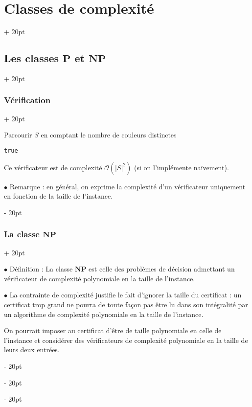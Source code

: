 \documentclass[a4paper, 12pt, twoside]{article}
\newenvironment{indalgo}[2][H]{
    \begin{algoBox}
        \begin{algorithm}[#1]
            \caption{#2}
}
{
        \end{algorithm}
    \end{algoBox}
}
\newcommand{\lr}[1]{\left( #1 \right)}
\newcommand{\set}[1]{\left\{ #1 \right\}}
\newcommand{\abs}[1]{\left\lvert #1 \right\rvert}
\newcommand{\ind}[1][20pt]{\advance\leftskip + #1}
\newcommand{\deind}[1][20pt]{\advance\leftskip - #1}
\newenvironment{indt}[2][20pt]{#2 \par \ind[#1]}{\par \deind} %
\begin{document}
\begin{indt}{\section{Classes de complexité}}
\begin{indt}{\subsection{Les classes $\mathbf P$ et $\mathbf{NP}$}}
\begin{indt}{\subsubsection{Vérification}}
\begin{indalgo}{Vérificateur du problème de coloration}
                    \BlankLine

                    Parcourir $S$ en comptant le nombre de couleurs distinctes\;


                    \For{tout $\set{s, s'} \in A$}{
                        \If{$c(s) = c(s')$}{
                            \Return \texttt{false}\;
                        }
                    }

                    \Return \texttt{true}\;
                \end{indalgo}

                Ce vérificateur est de complexité $\mathcal O\!\lr{\abs S ^2}$ (si on l'implémente naïvement).

                \vspace{12pt}
                
                $\bullet$ Remarque : en général, on exprime la complexité d'un vérificateur uniquement  en fonction de la taille de l'instance.
            \end{indt}

            \vspace{12pt}
            
            \begin{indt}{\subsubsection{La classe $\mathbf{NP}$}}
                \label{2.2.3}

                $\bullet$ Définition : La classe $\mathbf{NP}$ est celle des problèmes de décision admettant un vérificateur de complexité polynomiale en la taille de l'instance.

                \vspace{12pt}
                
                $\bullet$ La contrainte de complexité justifie le fait d'ignorer la taille du certificat : un certificat trop grand ne pourra de toute façon pas être lu dans son intégralité par un algorithme de complexité polynomiale en la taille de l'instance.

                On pourrait imposer au certificat d'être de taille polynomiale en celle de l'instance et considérer des vérificateurs de complexité polynomiale en la taille de leurs deux entrées.


\end{indt}
\end{indt}
\end{indt}
\end{document}
